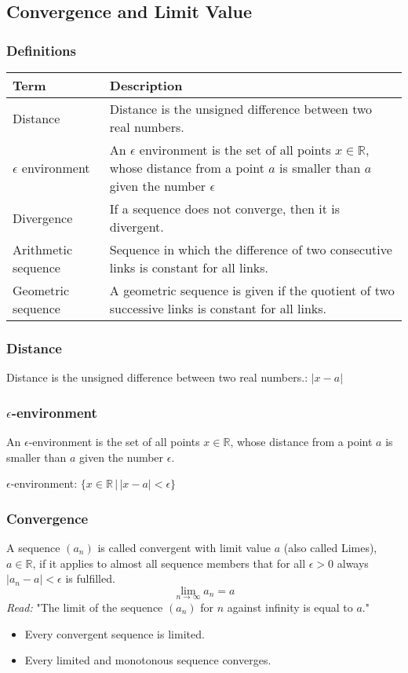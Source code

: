 \documentclass{book}
\begin{document}
\subsection{Convergence and Limit Value}
\subsubsection{Definitions}
\begin{tabular}{p{3cm}p{10.5cm}}
  \toprule
  \textbf{Term} & \textbf{Description} \\
  \midrule
  Distance & Distance is the unsigned difference between two real numbers.\\
  \midrule
  $\epsilon$ environment & An $\epsilon$ environment is the set of all points $x\in\mathbb{R}$, whose distance from a point $a$ is smaller than $a$ given the number $\epsilon$\\
  \midrule
  Divergence & If a sequence does not converge, then it is divergent.\\
  \midrule
  Arithmetic sequence & Sequence in which the difference of two consecutive links is constant for all links.\\
  \midrule
  Geometric sequence & A geometric sequence is given if the quotient of two successive links is constant for all links.\\ 
  \bottomrule
\end{tabular}
\subsubsection{Distance}
Distance is the unsigned difference between two real numbers.: $|x-a|$
\subsubsection{$\epsilon$-environment}
An $\epsilon$-environment is the set of all points $x \in \mathbb{R}$, whose distance from a point $a$ is smaller than $a$ given the number $\epsilon$.

$\epsilon$-environment: $\{x \in \mathbb{R}\,|\,|x-a| < \epsilon\}$

\subsubsection{Convergence}

A sequence $(a_{n})$ is called convergent with limit value $a$ (also called Limes), $a \in \mathbb{R}$, if it applies to almost all sequence members that for all $\epsilon > 0$ always $|a_{n} - a| < \epsilon$ is fulfilled.
\[
\lim\limits_{n\to \infty} a_{n} = a
\]
\textit{Read:} "The limit of the sequence $(a_{n})$ for $n$ against infinity is equal to $a$."
\begin{itemize}
\item Every convergent sequence is limited.
\item Every limited and monotonous sequence converges.
\end{itemize}
\end{document}
